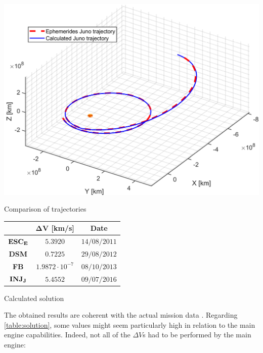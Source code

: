 \vspace{5pt}
\begin{minipage}{0.5\linewidth}
    \centering
    \captionsetup{type=figure}
    \includegraphics[width=\linewidth]{Images/trajectory.pdf}
    \caption{Comparison of trajectories}
    \label{fig:trajectory}
\end{minipage}\hfill
\begin{minipage}{0.5\linewidth}
    \centering
    \captionsetup{type=table}
    \renewcommand{\arraystretch}{1.5}
    \setlength\extrarowheight{-1pt}
    \begin{tabular}{|c|c|c|}
        \hline
        & $\boldsymbol{\Delta V}$ \textbf{[km/s]} & \textbf{Date} \\
        \hline
        $\textrm{\textbf{ESC}}_{\textrm{\textbf{E}}}$ & $5.3920$ & $14/08/2011$ \\
        \hline
        \textbf{DSM} & $0.7225$ & $29/08/2012$ \\
        \hline
        \textbf{FB} & $1.9872 \cdot 10^{-7}$ & $08/10/2013$ \\
        \hline
        $\textrm{\textbf{INJ}}_{\textrm{\textbf{J}}}$ & $5.4552$ & $09/07/2016$ \\
        \hline
    \end{tabular}
    \caption{Calculated solution}
    \label{table:solution}
\end{minipage} 
The obtained results are coherent with the actual mission data \cite{juno_navigation}. Regarding \autoref{table:solution}, some values might seem particularly high in relation to the main engine capabilities. 
Indeed, not all of the $\Delta V$s had to be performed by the main engine:
